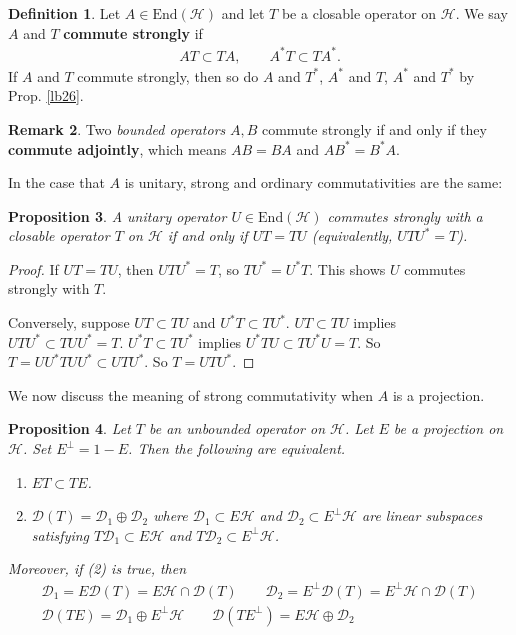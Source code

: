 \documentclass[12pt,b5paper,notitlepage]{article}
\theoremstyle{definition}
\newtheorem{df}{Definition}[section]
\newtheorem{rem}[df]{Remark}
\theoremstyle{plain}
\newtheorem{pp}[df]{Proposition}
\newcommand{\mc}{\mathcal}
\newcommand{\End}{\mathrm{End}} %
\newcommand{\Dom}{\scr D}
\newcommand{\scr}{\mathscr}
\numberwithin{equation}{section}
\begin{document}
\begin{df}\label{lb27}
Let $A\in\End(\mc H)$ and let $T$ be a closable operator on $\mc H$. We say $A$ and $T$ \textbf{commute strongly} if
\begin{align*}
AT\subset TA,\qquad A^*T\subset TA^*.	
\end{align*}
If $A$ and $T$ commute strongly, then so do $A$ and $T^*$, $A^*$ and $T$, $A^*$ and $T^*$ by Prop. \ref{lb26}.
\end{df}

\begin{rem}
Two \textit{bounded operators} $A,B$ commute strongly if and only if they \textbf{commute adjointly}, which means $AB=BA$ and $AB^*=B^*A$.
\end{rem}

In the case that $A$ is unitary, strong and ordinary commutativities are the same:

\begin{pp}\label{lb31}
A unitary operator $U\in\End(\mc H)$ commutes strongly with a closable operator $T$ on $\mc H$ if and only if $UT=TU$ (equivalently, $UTU^*=T$).
\end{pp}

\begin{proof}
If $UT=TU$, then $UTU^*=T$, so $TU^*=U^*T$. This shows $U$ commutes strongly with $T$.

Conversely, suppose $UT\subset TU$ and $U^*T\subset TU^*$. $UT\subset TU$ implies $UTU^*\subset TUU^*=T$. $U^*T\subset TU^*$ implies $U^*TU\subset TU^*U=T$. So  $T=UU^*TUU^*\subset UTU^*$. So $T=UTU^*$.
\end{proof}


We now discuss the meaning of strong commutativity when $A$ is a projection.

\begin{pp}\label{lb71}
Let $T$ be an unbounded operator on $\mc H$. Let $E$ be a projection on $\mc H$. Set $E^\perp=1-E$. Then the following are equivalent.
\begin{enumerate}
\item[(1)] $ET\subset TE$.
\item[(2)] $\Dom(T)=\Dom_1\oplus \Dom_2$ where $\Dom_1\subset E\mc H$ and $\Dom_2\subset E^\perp\mc H$ are linear subspaces satisfying $T\Dom_1\subset E\mc H$ and $T\Dom_2\subset E^\perp\mc H$.
\end{enumerate}
Moreover, if (2) is true, then 
\begin{subequations}\label{eq28}
\begin{gather}
\Dom_1=E\Dom(T)=E\mc H\cap\Dom(T)\qquad \Dom_2=E^\perp\Dom(T)=E^\perp\mc H\cap\Dom(T)\label{eq28a}\\
\Dom(TE)=\Dom_1\oplus E^\perp\mc H\qquad \Dom(TE^\perp)=E\mc H\oplus\Dom_2\label{eq28b}
\end{gather}
\end{subequations}
\end{pp}
\end{document}
